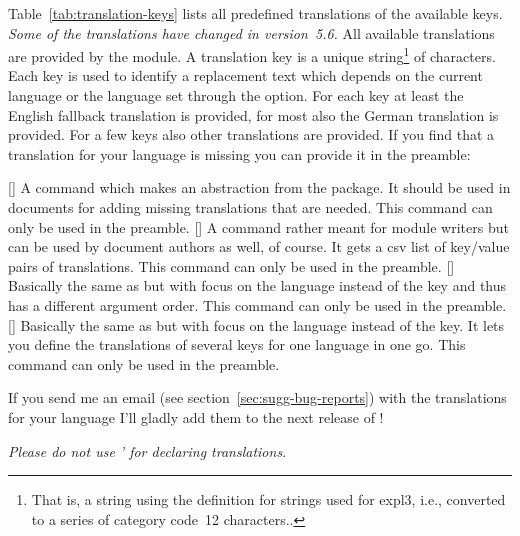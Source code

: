 \documentclass{chemmacros-manual}
\begin{document}
Table~\vref{tab:translation-keys} lists all predefined translations of the
available keys.  \emph{Some of the translations have changed in
  version~5.6.} All available translations are provided 
  by the  module.
  A translation key is a unique string\footnote{That is, a string
  using the definition for strings used for expl3, i.e., converted to a series
  of category code~12 characters..} of characters.  Each key is used to
identify a replacement text which depends on the current language or the
language set through the  option.  For each key at least the
English fallback translation is provided, for most also the German translation
is provided.  For a few keys also other translations are provided.  If you
find that a translation for your language is missing you can provide it in the
preamble:
\begin{commands}
  []
    A command which makes an abstraction from the
     package.  It should be used in documents for adding
    missing translations that are needed.  This command can only be used in
    the preamble.
  []
    A command rather meant for module writers but can be
    used by document authors as well, of course.  It gets a csv list of
    key\slash value pairs of translations.  This command can only be used in
    the preamble.
  []
    Basically the same as  but
    with focus on the language instead of the key and thus has a different
    argument order. This command can only be used in the preamble.
  []
    Basically the same as  but
    with focus on the language instead of the key. It lets you define the
    translations of several keys for one language in one go.  This command can
    only be used in the preamble.
\end{commands}
If you send me an email (see section~\vref{sec:sugg-bug-reports}) with the
translations for your language I'll gladly add them to the next release of
\chemmacros!

\emph{Please do not use '  for
  declaring translations.}
\end{document}

